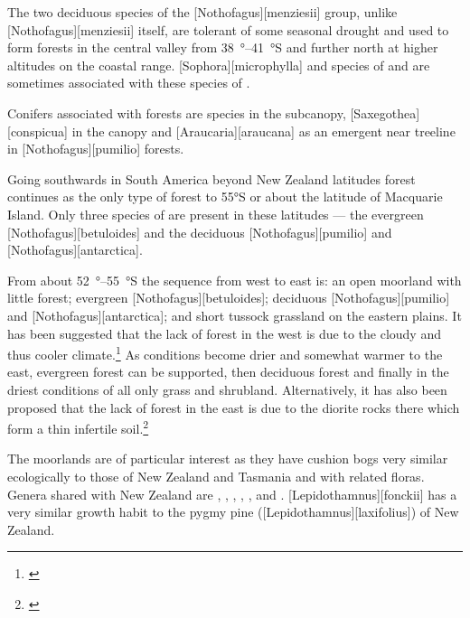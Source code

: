 The two deciduous species of the [Nothofagus][menziesii] group, unlike [Nothofagus][menziesii] itself, are tolerant of some seasonal drought and used to form forests in the central valley from \SIrange{38}{41}{\degree}S and further north at higher altitudes on the coastal range. [Sophora][microphylla] and species of  and  are sometimes associated with these species of .

Conifers associated with  forests are  species in the subcanopy, [Saxegothea][conspicua] in the canopy and [Araucaria][araucana] as an emergent near treeline in [Nothofagus][pumilio] forests.

Going southwards in South America beyond New Zealand latitudes  forest continues as the only type of forest to \ang{55}S or about the latitude of Macquarie Island.
Only three species of  are present in these latitudes --- the evergreen [Nothofagus][betuloides] and the deciduous [Nothofagus][pumilio] and [Nothofagus][antarctica].

From about \SIrange{52}{55}{\degree}S the sequence from west to east is: an open moorland with little forest; evergreen [Nothofagus][betuloides]; deciduous [Nothofagus][pumilio] and [Nothofagus][antarctica]; and short tussock grassland on the eastern plains.
It has been suggested that the lack of forest in the west is due to the cloudy and thus cooler climate.\footnote{\cite{mcqueen1976ecology}}
As conditions become drier and somewhat warmer to the east, evergreen  forest can be supported, then deciduous  forest and finally in the driest conditions of all only grass and shrubland.
Alternatively, it has also been proposed that the lack of forest in the east is due to the diorite rocks there which form a thin infertile soil.\footnote{\cite{godley1960botany}}

The moorlands are of particular interest as they have cushion bogs very similar ecologically to those of New Zealand and Tasmania and with related floras.
Genera shared with New Zealand are , , , , ,  and . [Lepidothamnus][fonckii] has a very similar growth habit to the pygmy pine ([Lepidothamnus][laxifolius]) of New Zealand.

